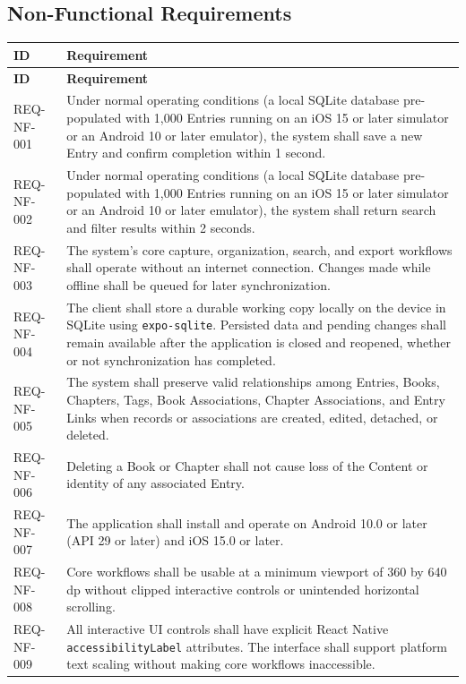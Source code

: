 \documentclass[11pt,a4paper]{article}
\begin{document}
\subsection{Non-Functional Requirements}
\begin{longtable}{|L{2.4cm}|L{13.6cm}|}
\hline \textbf{ID} & \textbf{Requirement} \\
\hline
\endfirsthead
\hline \textbf{ID} & \textbf{Requirement} \\
\hline
\endhead
REQ-NF-001 & Under normal operating conditions (a local SQLite database pre-populated with 1,000 Entries running on an iOS 15 or later simulator or an Android 10 or later emulator), the system shall save a new Entry and confirm completion within 1 second. \\ \hline
REQ-NF-002 & Under normal operating conditions (a local SQLite database pre-populated with 1,000 Entries running on an iOS 15 or later simulator or an Android 10 or later emulator), the system shall return search and filter results within 2 seconds. \\ \hline
REQ-NF-003 & The system's core capture, organization, search, and export workflows shall operate without an internet connection. Changes made while offline shall be queued for later synchronization. \\ \hline
REQ-NF-004 & The client shall store a durable working copy locally on the device in SQLite using \texttt{expo-sqlite}. Persisted data and pending changes shall remain available after the application is closed and reopened, whether or not synchronization has completed. \\ \hline
REQ-NF-005 & The system shall preserve valid relationships among Entries, Books, Chapters, Tags, Book Associations, Chapter Associations, and Entry Links when records or associations are created, edited, detached, or deleted. \\ \hline
REQ-NF-006 & Deleting a Book or Chapter shall not cause loss of the Content or identity of any associated Entry. \\ \hline
REQ-NF-007 & The application shall install and operate on Android 10.0 or later (API 29 or later) and iOS 15.0 or later. \\ \hline
REQ-NF-008 & Core workflows shall be usable at a minimum viewport of 360 by 640 dp without clipped interactive controls or unintended horizontal scrolling. \\ \hline
REQ-NF-009 & All interactive UI controls shall have explicit React Native \texttt{accessibilityLabel} attributes. The interface shall support platform text scaling without making core workflows inaccessible. \\ \hline

\end{longtable}
\end{document}

